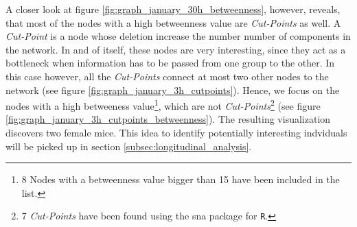 A closer look at figure \ref{fig:graph_january_30h_betweenness}, however, reveals, that most of the nodes with a high betweenness value are \textit{Cut-Points} as well. A \textit{Cut-Point} is a node whose deletion increase the number number of components in the network\cite{pajek:03}. In and of itself, these nodes are very interesting, since they act as a bottleneck when information has to be passed from one group to the other. In this case however, all the \textit{Cut-Points} connect at most two other nodes to the network (see figure \ref{fig:graph_january_3h_cutpoints}). Hence, we focus on the nodes with a high betweeness value\footnote{8 Nodes with a betweenness value bigger than 15 have been included in the list.}, which are not \textit{Cut-Points}\footnote{7 \textit{Cut-Points} have been found using the sna\cite{sna:09} package for \lstinline|R|.} (see figure \ref{fig:graph_january_3h_cutpoints_betweenness}). The resulting visualization discovers two female mice. This idea to identify potentially interesting indviduals will be picked up in section \ref{subsec:longitudinal_analysis}. 

